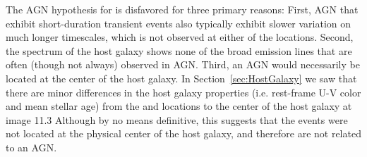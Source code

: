 %

The AGN hypothesis for \spock is disfavored for three primary reasons:
First, AGN that exhibit short-duration transient events also typically
exhibit slower variation on much longer timescales, which is not
observed at either of the \spock locations. Second, the spectrum of
the \spock host galaxy shows none of the broad emission lines that are
often (though not always) observed in AGN.  Third, an AGN would
necessarily be located at the center of the host galaxy.  In
Section~\ref{sec:HostGalaxy} we saw that there are minor differences
in the host galaxy properties (i.e. rest-frame U-V color and mean
stellar age) from the \spockone and \spocktwo locations to the center
of the host galaxy at image 11.3 Although by no means definitive, this
suggests that the \spock events were not located at the physical
center of the host galaxy, and therefore are not related to an
AGN. 
